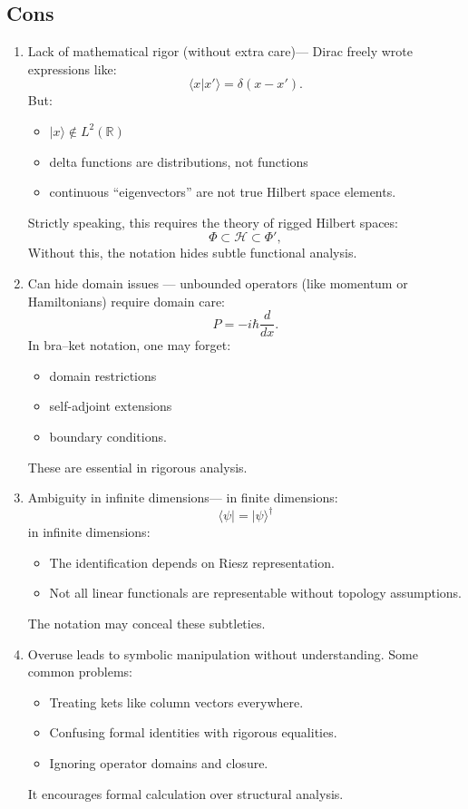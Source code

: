 \subsection{ Cons}
\begin{enumerate}
   \item
Lack of mathematical rigor (without extra care)---
Dirac freely wrote expressions like:
\[\langle x|x' \rangle = \delta(x-x').\]
But:
\begin{itemize}
\item
  \(|x\rangle \notin L^2(\mathbb{R})\)
\item
  delta functions are distributions, not functions
\item
  continuous ``eigenvectors'' are not true Hilbert space elements.
\end{itemize}
Strictly speaking, this requires the theory of rigged Hilbert spaces:
\[\Phi \subset \mathcal{H} \subset \Phi',\]
Without this, the notation hides subtle functional analysis.
   \item
Can hide domain issues ---
unbounded operators (like momentum or Hamiltonians) require domain care:
\[P = -i\hbar \frac{d}{dx}.\]
In bra--ket notation, one may forget:
\begin{itemize}
\item
  domain restrictions
\item
  self-adjoint extensions
\item
  boundary conditions.
\end{itemize}
These are essential in rigorous analysis.
   \item
Ambiguity in infinite dimensions---
in finite dimensions:
\[\langle \psi| = |\psi\rangle^\dagger\]
in infinite dimensions:
\begin{itemize}
\item
  The identification depends on Riesz representation.
\item
  Not all linear functionals are representable without topology
  assumptions.
\end{itemize}
The notation may conceal these subtleties.
   \item
 Overuse leads to symbolic manipulation without understanding.
Some common problems:
\begin{itemize}
\item
  Treating kets like column vectors everywhere.
\item
  Confusing formal identities with rigorous equalities.
\item
  Ignoring operator domains and closure.
\end{itemize}
It encourages formal calculation over structural analysis.
\end{enumerate}


